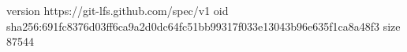 version https://git-lfs.github.com/spec/v1
oid sha256:691fc8376d03ff6ca9a2d0dc64fc51bb99317f033e13043b96e635f1ca8a48f3
size 87544
